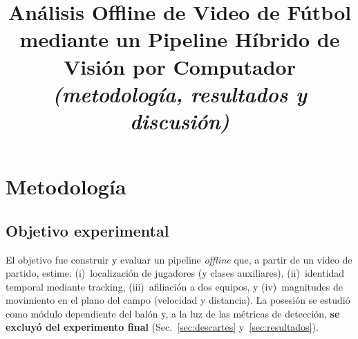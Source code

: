 \documentclass[conference]{IEEEtran}
\begin{document}
\title{Análisis Offline de Video de Fútbol mediante un Pipeline Híbrido de Visión por Computador\\
\large\textit{(metodología, resultados y discusión)}}

\author{
}

\maketitle

\begin{center}
\end{center}
\vspace{0.6em}

\section{Metodología}
\label{sec:metodologia}

\subsection{Objetivo experimental}
El objetivo fue construir y evaluar un pipeline \emph{offline} que, a partir de un video de partido, estime: (i)~localización de jugadores (y clases auxiliares), (ii)~identidad temporal mediante tracking, (iii)~afiliación a dos equipos, y (iv)~magnitudes de movimiento en el plano del campo (velocidad y distancia). La posesión se estudió como módulo dependiente del balón y, a la luz de las métricas de detección, \textbf{se excluyó del experimento final} (Sec.~\ref{sec:descartes} y~\ref{sec:resultados}).
\end{document}

